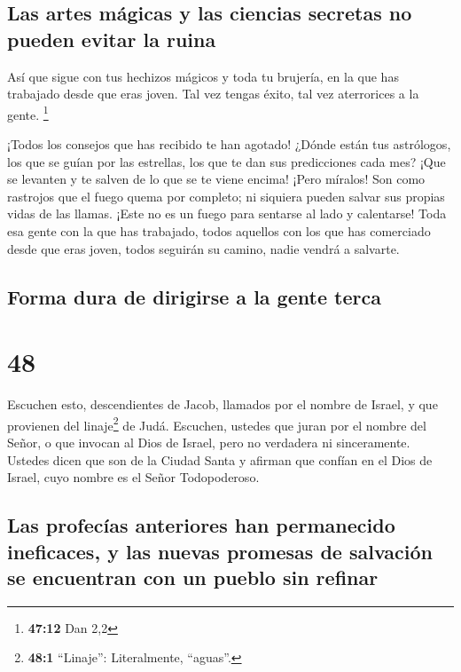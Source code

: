 \hypertarget{las-artes-muxe1gicas-y-las-ciencias-secretas-no-pueden-evitar-la-ruina}{%
\subsection{Las artes mágicas y las ciencias secretas no pueden evitar
la
ruina}\label{las-artes-muxe1gicas-y-las-ciencias-secretas-no-pueden-evitar-la-ruina}}

 Así que sigue con tus hechizos mágicos y toda tu
brujería, en la que has trabajado desde que eras joven. Tal vez tengas
éxito, tal vez aterrorices a la gente. \footnote{\textbf{47:12} Dan 2,2}

 ¡Todos los consejos que has recibido te han agotado!
¿Dónde están tus astrólogos, los que se guían por las estrellas, los que
te dan sus predicciones cada mes? ¡Que se levanten y te salven de lo que
se te viene encima!  ¡Pero míralos! Son como rastrojos
que el fuego quema por completo; ni siquiera pueden salvar sus propias
vidas de las llamas. ¡Este no es un fuego para sentarse al lado y
calentarse!  Toda esa gente con la que has trabajado,
todos aquellos con los que has comerciado desde que eras joven, todos
seguirán su camino, nadie vendrá a salvarte.

\hypertarget{forma-dura-de-dirigirse-a-la-gente-terca}{%
\subsection{Forma dura de dirigirse a la gente
terca}\label{forma-dura-de-dirigirse-a-la-gente-terca}}

\hypertarget{section-47}{%
\section{48}\label{section-47}}

 Escuchen esto, descendientes de Jacob, llamados por el
nombre de Israel, y que provienen del linaje\footnote{\textbf{48:1}
  ``Linaje'': Literalmente, ``aguas''.} de Judá. Escuchen, ustedes que
juran por el nombre del Señor, o que invocan al Dios de Israel, pero no
verdadera ni sinceramente.  Ustedes dicen que son de la
Ciudad Santa y afirman que confían en el Dios de Israel, cuyo nombre es
el Señor Todopoderoso.

\hypertarget{las-profecuxedas-anteriores-han-permanecido-ineficaces-y-las-nuevas-promesas-de-salvaciuxf3n-se-encuentran-con-un-pueblo-sin-refinar}{%
\subsection{Las profecías anteriores han permanecido ineficaces, y las
nuevas promesas de salvación se encuentran con un pueblo sin
refinar}\label{las-profecuxedas-anteriores-han-permanecido-ineficaces-y-las-nuevas-promesas-de-salvaciuxf3n-se-encuentran-con-un-pueblo-sin-refinar}}

